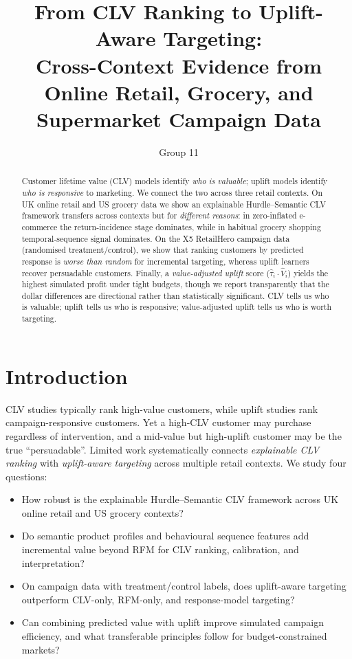 \documentclass[11pt]{article}
\title{From CLV Ranking to Uplift-Aware Targeting:\\
Cross-Context Evidence from Online Retail, Grocery, and Supermarket Campaign Data}
\author{Group 11}
\date{}
\begin{document}
\maketitle

\begin{abstract}
Customer lifetime value (CLV) models identify \emph{who is valuable}; uplift models identify
\emph{who is responsive} to marketing. We connect the two across three retail contexts. On
UK online retail and US grocery data we show an explainable Hurdle--Semantic CLV framework
transfers across contexts but for \emph{different reasons}: in zero-inflated e-commerce the
return-incidence stage dominates, while in habitual grocery shopping temporal-sequence signal
dominates. On the X5 RetailHero campaign data (randomised treatment/control), we show that
ranking customers by predicted response is \emph{worse than random} for incremental targeting,
whereas uplift learners recover persuadable customers. Finally, a \emph{value-adjusted uplift}
score ($\hat\tau_i\cdot\hat V_i$) yields the highest simulated profit under tight budgets,
though we report transparently that the dollar differences are directional rather than
statistically significant. CLV tells us who is valuable; uplift tells us who is responsive;
value-adjusted uplift tells us who is worth targeting.
\end{abstract}

\section{Introduction}
CLV studies typically rank high-value customers, while uplift studies rank campaign-responsive
customers. Yet a high-CLV customer may purchase regardless of intervention, and a mid-value but
high-uplift customer may be the true ``persuadable''. Limited work systematically connects
\emph{explainable CLV ranking} with \emph{uplift-aware targeting} across multiple retail contexts.
We study four questions:
\begin{itemize}
  \item[\textbf{RQ1}] How robust is the explainable Hurdle--Semantic CLV framework across UK
  online retail and US grocery contexts?
  \item[\textbf{RQ2}] Do semantic product profiles and behavioural sequence features add
  incremental value beyond RFM for CLV ranking, calibration, and interpretation?
  \item[\textbf{RQ3}] On campaign data with treatment/control labels, does uplift-aware targeting
  outperform CLV-only, RFM-only, and response-model targeting?
  \item[\textbf{RQ4}] Can combining predicted value with uplift improve simulated campaign
  efficiency, and what transferable principles follow for budget-constrained markets?
\end{itemize}
\end{document}

